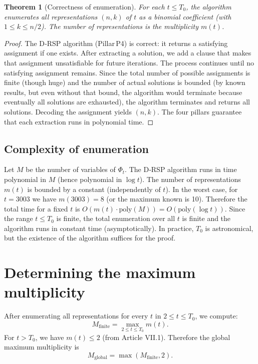 \documentclass[11pt,a4paper]{article}
\newtheorem{theorem}{Theorem}[section]
\begin{document}
\begin{theorem}[Correctness of enumeration]
\label{thm:enum}
For each \(t \le T_0\), the algorithm enumerates all representations \((n,k)\) of \(t\) as a binomial coefficient (with \(1\le k\le n/2\)). The number of representations is the multiplicity \(m(t)\).
\end{theorem}
\begin{proof}
The D‑RSP algorithm (Pillar P4) is correct: it returns a satisfying assignment if one exists. After extracting a solution, we add a clause that makes that assignment unsatisfiable for future iterations. The process continues until no satisfying assignment remains. Since the total number of possible assignments is finite (though huge) and the number of actual solutions is bounded (by known results, but even without that bound, the algorithm would terminate because eventually all solutions are exhausted), the algorithm terminates and returns all solutions. Decoding the assignment yields \((n,k)\). The four pillars guarantee that each extraction runs in polynomial time.
\end{proof}

\subsection{Complexity of enumeration}

Let \(M\) be the number of variables of \(\Phi_t\). The D‑RSP algorithm runs in time polynomial in \(M\) (hence polynomial in \(\log t\)). The number of representations \(m(t)\) is bounded by a constant (independently of \(t\)). In the worst case, for \(t=3003\) we have \(m(3003)=8\) (or the maximum known is 10). Therefore the total time for a fixed \(t\) is \(O(m(t) \cdot \text{poly}(M)) = O(\text{poly}(\log t))\). Since the range \(t \le T_0\) is finite, the total enumeration over all \(t\) is finite and the algorithm runs in constant time (asymptotically). In practice, \(T_0\) is astronomical, but the existence of the algorithm suffices for the proof.

\section{Determining the maximum multiplicity}

After enumerating all representations for every \(t\) in \(2 \le t \le T_0\), we compute:
\[
M_{\text{finite}} = \max_{2\le t\le T_0} m(t).
\]
For \(t > T_0\), we have \(m(t) \le 2\) (from Article VII.1). Therefore the global maximum multiplicity is
\[
M_{\text{global}} = \max(M_{\text{finite}}, 2).
\]
\end{document}
